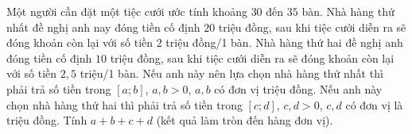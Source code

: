 \begin{ex}
Một người cần đặt một tiệc cưới ước tính khoảng $30$ đến $35$ bàn. Nhà hàng thứ nhất đề nghị anh nay đóng tiền cố định $20$ triệu đồng, sau khi tiệc cưới diễn ra sẽ đóng khoản còn lại với số tiền $2$ triệu đồng/1 bàn. Nhà hàng thứ hai đề nghị anh đóng tiền cố định $10$ triệu đồng, sau khi tiệc cưới diễn ra sẽ đóng khoản còn lại với số tiền $2{,}5$ triệu/1 bàn. Nếu anh này nên lựa chọn nhà hàng thứ nhất thì phải trả số tiền trong $[a;b]$, $a,b>0$, $a,b$ có đơn vị triệu đồng. Nếu anh này chọn nhà hàng thứ hai thì phải trả số tiền trong $[c;d]$, $c,d>0$, $c,d$ có đơn vị là triệu đồng. Tính $a+b+c+d$ (kết quả làm tròn đến hàng đơn vị).
\end{ex}
